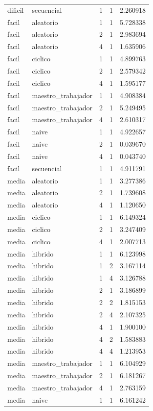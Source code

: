 \begin{longtable}{llrrr}
dificil & secuencial & 1 & 1 & 2.260918 \\
facil & aleatorio & 1 & 1 & 5.728338 \\
facil & aleatorio & 2 & 1 & 2.983694 \\
facil & aleatorio & 4 & 1 & 1.635906 \\
facil & ciclico & 1 & 1 & 4.899763 \\
facil & ciclico & 2 & 1 & 2.579342 \\
facil & ciclico & 4 & 1 & 1.595177 \\
facil & maestro\_trabajador & 1 & 1 & 4.908384 \\
facil & maestro\_trabajador & 2 & 1 & 5.249495 \\
facil & maestro\_trabajador & 4 & 1 & 2.610317 \\
facil & naive & 1 & 1 & 4.922657 \\
facil & naive & 2 & 1 & 0.039670 \\
facil & naive & 4 & 1 & 0.043740 \\
facil & secuencial & 1 & 1 & 4.911791 \\
media & aleatorio & 1 & 1 & 3.277386 \\
media & aleatorio & 2 & 1 & 1.739608 \\
media & aleatorio & 4 & 1 & 1.120650 \\
media & ciclico & 1 & 1 & 6.149324 \\
media & ciclico & 2 & 1 & 3.247409 \\
media & ciclico & 4 & 1 & 2.007713 \\
media & hibrido & 1 & 1 & 6.123998 \\
media & hibrido & 1 & 2 & 3.167114 \\
media & hibrido & 1 & 4 & 3.126788 \\
media & hibrido & 2 & 1 & 3.186899 \\
media & hibrido & 2 & 2 & 1.815153 \\
media & hibrido & 2 & 4 & 2.107325 \\
media & hibrido & 4 & 1 & 1.900100 \\
media & hibrido & 4 & 2 & 1.583883 \\
media & hibrido & 4 & 4 & 1.213953 \\
media & maestro\_trabajador & 1 & 1 & 6.104929 \\
media & maestro\_trabajador & 2 & 1 & 6.181267 \\
media & maestro\_trabajador & 4 & 1 & 2.763159 \\
media & naive & 1 & 1 & 6.161242 \\

\end{longtable}
